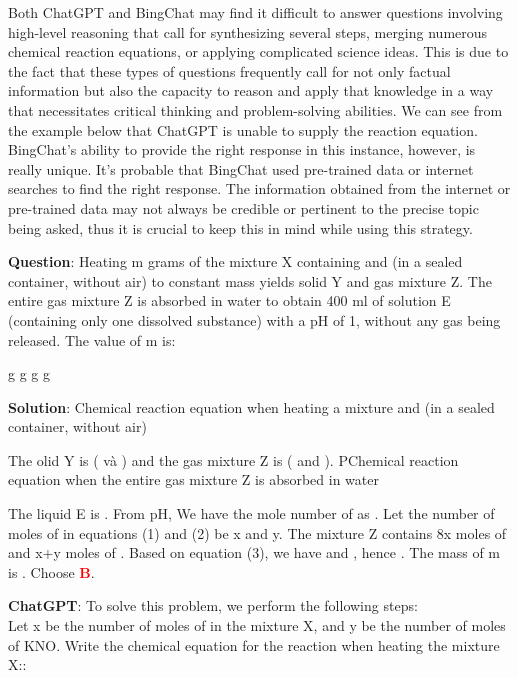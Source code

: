 \documentclass{article}
\begin{document}
{	Both ChatGPT and BingChat may find it difficult to answer questions involving high-level reasoning that call for synthesizing several steps, merging numerous chemical reaction equations, or applying complicated science ideas. This is due to the fact that these types of questions frequently call for not only factual information but also the capacity to reason and apply that knowledge in a way that necessitates critical thinking and problem-solving abilities. We can see from the example below that ChatGPT is unable to supply the reaction equation. BingChat's ability to provide the right response in this instance, however, is really unique. It's probable that BingChat used pre-trained data or internet searches to find the right response. The information obtained from the internet or pre-trained data may not always be credible or pertinent to the precise topic being asked, thus it is crucial to keep this in mind while using this strategy.
	
	
	
	\begin{mdframed}[linewidth=1pt,linecolor=red] \textbf{Question}: Heating m grams of the mixture X containing  and  (in a sealed container, without air) to constant mass yields solid Y and gas mixture Z. The entire gas mixture Z is absorbed in water to obtain 400 ml of solution E (containing only one dissolved substance) with a pH of 1, without any gas being released. The value of m is:
		
		\begin{oneparchoices}
			 g
			 g
			 g
			 g
		\end{oneparchoices}
		
		\textbf{Solution}: Chemical reaction equation when heating a mixture  and  (in a sealed container, without air)  
		 
		 
		The olid Y is ( và ) and the gas mixture Z is ( and ). 
		PChemical reaction equation when the entire gas mixture Z is absorbed in water
		
		The liquid E is . From pH, We have the mole number of  as . Let the number of moles of  in equations (1) and (2) be x and y. The mixture Z contains 8x moles of  and x+y moles of . Based on equation (3), we have  and , hence . The mass of m is . Choose \textcolor{red}{\textbf{B}}. 
		
		
		\textbf{ChatGPT}: 
		To solve this problem, we perform the following steps:\\
		Let x be the number of moles of  in the mixture X, and y be the number of moles of KNO.
		Write the chemical equation for the reaction when heating the mixture X::
		

\end{mdframed}}
\end{document}

